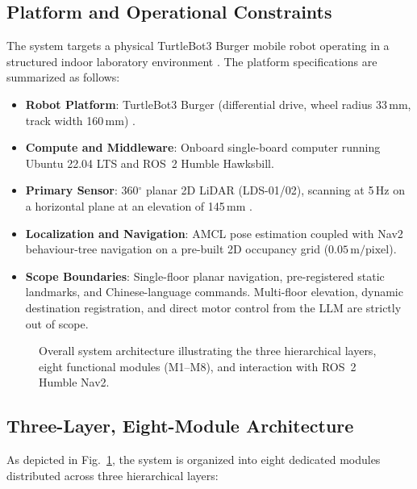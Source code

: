 \documentclass[conference]{IEEEtran}
\begin{document}
\subsection{Platform and Operational Constraints}
The system targets a physical TurtleBot3 Burger mobile robot operating in a structured indoor laboratory environment \cite{RobotisTurtlebot3}. The platform specifications are summarized as follows:
\begin{itemize}
    \item \textbf{Robot Platform}: TurtleBot3 Burger (differential drive, wheel radius 33\,mm, track width 160\,mm) \cite{RobotisTurtlebot3}.
    \item \textbf{Compute and Middleware}: Onboard single-board computer running Ubuntu 22.04 LTS and ROS~2 Humble Hawksbill.
    \item \textbf{Primary Sensor}: 360$^\circ$ planar 2D LiDAR (LDS-01/02), scanning at 5\,Hz on a horizontal plane at an elevation of 145\,mm \cite{RobotisTurtlebot3}.
    \item \textbf{Localization and Navigation}: AMCL pose estimation coupled with Nav2 behaviour-tree navigation on a pre-built 2D occupancy grid ($0.05\,\text{m}/\text{pixel}$).
    \item \textbf{Scope Boundaries}: Single-floor planar navigation, pre-registered static landmarks, and Chinese-language commands. Multi-floor elevation, dynamic destination registration, and direct motor control from the LLM are strictly out of scope.
\end{itemize}

\begin{figure}[t]
\centering

\caption{Overall system architecture illustrating the three hierarchical layers, eight functional modules (M1--M8), and interaction with ROS~2 Humble Nav2.}
\label{fig:arch}
\end{figure}

\subsection{Three-Layer, Eight-Module Architecture}
As depicted in Fig.~\ref{fig:arch}, the system is organized into eight dedicated modules distributed across three hierarchical layers:
\end{document}
